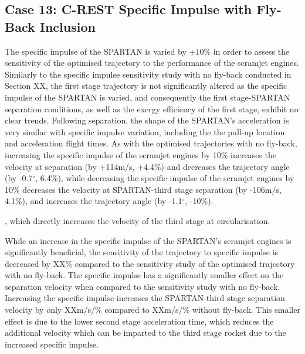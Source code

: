 \subsection{Case 13: C-REST Specific Impulse with Fly-Back Inclusion}

The specific impulse of the SPARTAN is varied by $\pm10\%$ in order to assess the sensitivity of the optimised trajectory to the performance of the scramjet engines.  
Similarly to the specific impulse sensitivity study with no fly-back conducted in Section XX, the first stage trajectory is not significantly altered as the specific impulse of the SPARTAN is varied, and consequently the first stage-SPARTAN separation conditions, as well as the exergy efficiency of the first stage, exhibit no clear trends. Following separation, the shape of the SPARTAN's acceleration is very similar with specific impulse variation, including the the pull-up location and acceleration flight times. As with the optimised trajectories with no fly-back, increasing the specific impulse of the scramjet engines by 10\% increases the velocity at separation (by +114m/s, +4.4\%) and decreases the trajectory angle (by -0.7$^\circ$, 6.4\%), while decreasing the specific impulse of the scramjet engines by 10\% decreases the velocity at SPARTAN-third stage separation (by -106m/s, 4.1\%), and increases the trajectory angle (by -1.1$^\circ$, -10\%).

, which directly increases the velocity of the third stage at circularisation.

While an increase in the specific impulse of the SPARTAN's scramjet engines is significantly beneficial, the sensitivity of the trajectory to specific impulse is decreased by XX\% compared to the sensitivity study of the optimised trajectory with no fly-back. 
The specific impulse has a significantly smaller effect on the separation velocity when compared to the sensitivity study with no fly-back. Increasing the specific impulse increases the SPARTAN-third stage separation velocity by only XXm/s/\% compared to XXm/s/\% without fly-back.  
This smaller effect is due to the lower second stage acceleration time, which reduces the additional velocity which can be imparted to the third stage rocket due to the increased specific impulse. 






